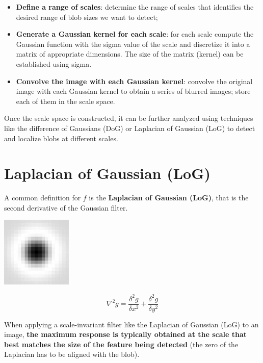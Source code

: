 \documentclass{article}
\begin{document}
\begin{itemize}
    \item \textbf{Define a range of scales}: determine the range of scales that identifies the desired range of blob sizes we want to detect;
    \item \textbf{Generate a Gaussian kernel for each scale}: for each scale compute the Gaussian function with the sigma value of the scale and discretize it into a matrix of appropriate dimensions. The size of the matrix (kernel) can be established using sigma.
    \item \textbf{Convolve the image with each Gaussian kernel}: convolve the original image with each Gaussian kernel to obtain a series of blurred images; store each of them in the scale space.
\end{itemize}

Once the scale space is constructed, it can be further analyzed using techniques like the difference of Gaussians (DoG) or Laplacian of Gaussian (LoG) to detect and localize blobs at different scales.

\newpage

\section*{Laplacian of Gaussian (LoG)}

A common definition for $f$ is the \textbf{Laplacian of Gaussian (LoG)}, that is the second derivative of the Gaussian filter.

\begin{center}
    \includegraphics[width=.3\linewidth]{images/laplacian_of_gaussian.jpg}    
\end{center}

\begin{equation*}
    \nabla^2g = \frac{\delta^2g}{\delta x^2} + \frac{\delta^2g}{\delta y^2} 
\end{equation*}

When applying a scale-invariant filter like the Laplacian of Gaussian (LoG) to an image, \textbf{the maximum response is typically obtained at the scale that best matches the size of the feature being detected} (the zero of the Laplacian has to be aligned with the blob). \\
\end{document}
